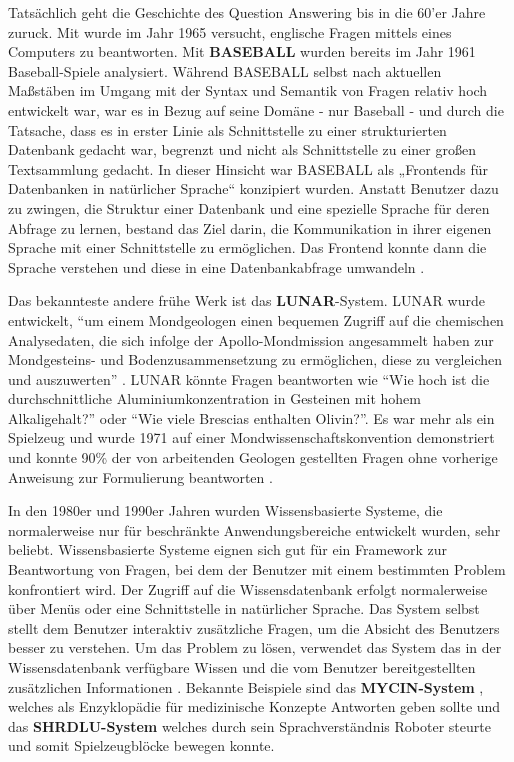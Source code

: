 \documentclass[
        ngerman,
        paper=a4,
        numbers=noendperiod,
]{scrreprt}
\begin{document}
Tatsächlich geht die Geschichte des Question Answering bis in die 60'er Jahre zuruck. Mit \citep{Simmons1964IndexingQuestions} wurde im Jahr 1965 versucht, englische Fragen mittels eines Computers zu beantworten. Mit \textbf{BASEBALL} \citep{Green1961Baseball:Question-answerer} wurden bereits im Jahr 1961 Baseball-Spiele analysiert. Während BASEBALL selbst nach aktuellen Maßstäben im Umgang mit der Syntax und Semantik von Fragen relativ hoch entwickelt war, war es in Bezug auf seine Domäne - nur Baseball - und durch die Tatsache, dass es in erster Linie als Schnittstelle zu einer strukturierten Datenbank gedacht war, begrenzt und nicht als Schnittstelle zu einer großen Textsammlung gedacht. In dieser Hinsicht war BASEBALL als „Frontends für Datenbanken in natürlicher Sprache“ konzipiert wurden. Anstatt Benutzer dazu zu zwingen, die Struktur einer Datenbank und eine spezielle Sprache für deren Abfrage zu lernen, bestand das Ziel darin, die Kommunikation in ihrer eigenen Sprache mit einer Schnittstelle zu ermöglichen. Das Frontend konnte dann die Sprache verstehen und diese in eine Datenbankabfrage umwandeln \citep[S. 279-280]{Hirschman2001NaturalHere}.

Das bekannteste andere frühe Werk ist das \textbf{LUNAR}-System. LUNAR wurde entwickelt, \enquote{um einem Mondgeologen einen bequemen Zugriff auf die chemischen Analysedaten, die sich infolge der Apollo-Mondmission angesammelt haben zur Mondgesteins- und Bodenzusammensetzung zu ermöglichen, diese zu vergleichen und auszuwerten} \citep{4-8ProgressGeology}. LUNAR könnte Fragen beantworten wie \enquote{Wie hoch ist die durchschnittliche Aluminiumkonzentration in Gesteinen mit hohem Alkaligehalt?} oder \enquote{Wie viele Brescias enthalten Olivin?}. Es war mehr als ein Spielzeug und wurde 1971 auf einer Mondwissenschaftskonvention demonstriert und konnte 90\% der von arbeitenden Geologen gestellten Fragen ohne vorherige Anweisung zur Formulierung beantworten \citep[S. 280]{Hirschman2001NaturalHere}. 


In den 1980er und 1990er Jahren wurden Wissensbasierte Systeme, die normalerweise nur für beschränkte Anwendungsbereiche entwickelt wurden, sehr beliebt. Wissensbasierte Systeme  eignen sich gut für ein Framework zur Beantwortung von Fragen, bei dem der Benutzer mit einem bestimmten Problem konfrontiert wird. Der Zugriff auf die Wissensdatenbank erfolgt normalerweise über Menüs oder eine Schnittstelle in natürlicher Sprache. Das System selbst stellt dem Benutzer interaktiv zusätzliche Fragen, um die Absicht des Benutzers besser zu verstehen. Um das Problem zu lösen, verwendet das System das in der Wissensdatenbank verfügbare Wissen und die vom Benutzer bereitgestellten zusätzlichen Informationen \citep [S. 5415]{Kolomiyets2011APerspective}. Bekannte Beispiele sind das \textbf{MYCIN-System} \citep{edward1976shortliffe}, welches als Enzyklopädie für medizinische Konzepte Antworten geben sollte und das \textbf{SHRDLU-System} \citep{winograd1971procedures} welches durch sein Sprachverständnis Roboter steurte und somit Spielzeugblöcke bewegen konnte.
\end{document}
